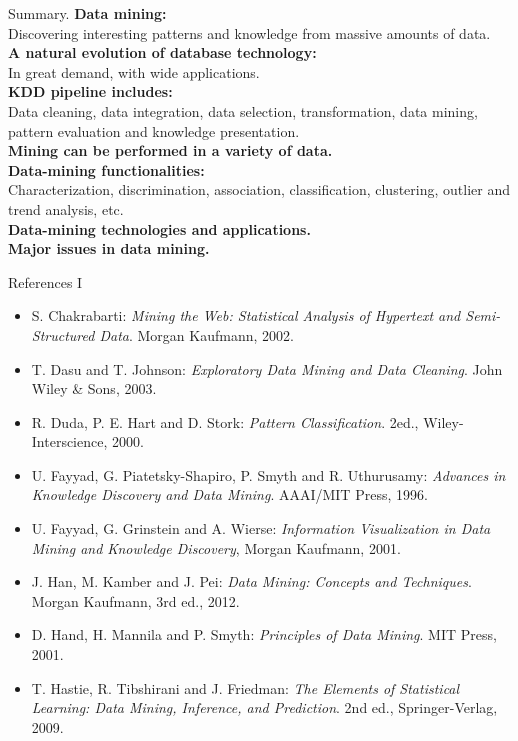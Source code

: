 \documentclass[aspectratio=169,t]{beamer}
\begin{document}
 { 
    \begin{frame}{Summary.}
    \textbf{Data mining:}\\
    Discovering interesting patterns and knowledge from massive amounts of data.\\[0.2cm]

    \textbf{A natural evolution of database technology:}\\
    In great demand, with wide applications.\\[0.2cm]

    \textbf{KDD pipeline includes:}\\
    Data cleaning, data integration, data selection, transformation, data mining, pattern evaluation and knowledge presentation.\\[0.2cm]

    \textbf{Mining can be performed in a variety of data.}\\
    \textbf{Data-mining functionalities:}\\
    Characterization, discrimination, association, classification, clustering, outlier and trend analysis, etc.\\[0.2cm]

    \textbf{Data-mining technologies and applications.}\\
    \textbf{Major issues in data mining.}\\
    \end{frame}
  }


  { 
    \begin{frame}{References I}
        \begin{itemize}
          \item S. Chakrabarti: \emph{Mining the Web: Statistical Analysis of Hypertext and Semi-Structured Data}. Morgan Kaufmann, 2002.
          \item T. Dasu and T. Johnson: \emph{Exploratory Data Mining and Data Cleaning}. John Wiley \& Sons, 2003.
          \item R. Duda, P. E. Hart and D. Stork: \emph{Pattern Classification}. 2ed., Wiley-Interscience, 2000.
          \item U. Fayyad, G. Piatetsky-Shapiro, P. Smyth and R. Uthurusamy: \emph{Advances in Knowledge Discovery and Data Mining}. AAAI/MIT Press, 1996.
          \item U. Fayyad, G. Grinstein and A. Wierse: \emph{Information Visualization in Data Mining and Knowledge Discovery}, Morgan Kaufmann, 2001.
          \item J. Han, M. Kamber and J. Pei: \emph{Data Mining: Concepts and Techniques}. Morgan Kaufmann, 3rd ed., 2012.
          \item D. Hand, H. Mannila and P. Smyth: \emph{Principles of Data Mining}. MIT Press, 2001.
          \item T. Hastie, R. Tibshirani and J. Friedman: \emph{The Elements of Statistical Learning: Data Mining, Inference, and Prediction}. 2nd ed., Springer-Verlag, 2009.
        \end{itemize}
    \end{frame}
  }
\end{document}
